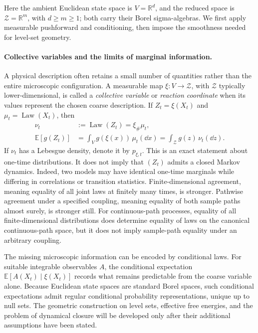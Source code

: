 \documentclass[12pt,a4paper,oneside]{book}
\begin{document}
Here the ambient Euclidean state space is $V=\mathbb R^d$, and the
reduced space is $\mathcal Z=\mathbb R^m$, with $d\ge m\ge1$; both carry
their Borel sigma-algebras. We first apply measurable pushforward and
conditioning, then impose the smoothness needed for level-set geometry.

\paragraph{Collective variables and the limits of marginal information.}
A physical description often retains a small number of quantities rather
than the entire microscopic configuration. A measurable map
$\xi:V\to\mathcal Z$, with $\mathcal Z$ typically lower-dimensional, is called a
\emph{collective variable} or \emph{reaction coordinate} when its values
represent the chosen coarse description. If $Z_t=\xi(X_t)$ and
$\mu_t=\operatorname{Law}(X_t)$, then
\begin{equation*}
\begin{aligned}
 \nu_t&:=\operatorname{Law}(Z_t)=\xi_\#\mu_t,\\
 \mathbb E[g(Z_t)]
 &=\int_V g(\xi(x))\,\mu_t(\dd x)
 =\int_{\mathcal Z} g(z)\,\nu_t(\dd z).
\end{aligned}
\end{equation*}
If $\nu_t$ has a Lebesgue density, denote it by $p_{\xi,t}$. This is an exact statement about one-time distributions. It does not
imply that $(Z_t)$ admits a closed Markov dynamics. Indeed, two models may
have identical one-time marginals while differing in correlations or
transition statistics. Finite-dimensional agreement, meaning equality
of all joint laws at finitely many times, is stronger. Pathwise agreement
under a specified coupling, meaning equality of both sample paths almost
surely, is stronger still. For continuous-path processes, equality of
all finite-dimensional distributions does determine equality of laws on
the canonical continuous-path space, but it does not imply sample-path
equality under an arbitrary coupling.

The missing microscopic information can be encoded by conditional laws.
For suitable integrable observables $A$, the conditional expectation
$\mathbb E[A(X_t)\mid\xi(X_t)]$ records what remains predictable from
the coarse variable alone. Because Euclidean state spaces are standard
Borel spaces, such conditional expectations admit regular conditional
probability representations, unique up to null sets. The geometric
construction on level sets, effective free energies, and the problem of
dynamical closure will be developed only after their additional
assumptions have been stated.
\end{document}
